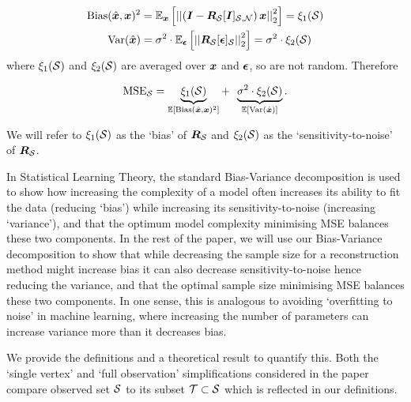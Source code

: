 \begin{align}
    \text{Bias}(\hat{\vect{x}}, \vect{x})^{2} &= \expect[\vect{x}]{\sqnormvec{\left(\matr{I} - \matr{R}_{\set{S}}\matrsub[S,N]{I}\right)\vect{x}}} 
 = \xi_{1}(\set{S}) \label{eq:def_bias_gen}\\
    \text{Var}(\hat{\vect{x}}) &= \sigma^{2} \cdot \expect[\vect{\epsilon}]{\sqnormvec{\matr{R}_{\set{S}}\vectsub[S]{\epsilon}}} = \sigma^{2} \cdot \xi_{2}(\set{S})\label{eq:def_var_gen}
\end{align}
where $\xi_{1}(\mathcal{S})$ and $\xi_{2}(\mathcal{S})$ are averaged over $\bm{x}$ and $\bm{\epsilon}$, so are not random. Therefore

\begin{equation}
    \textrm{MSE}_{\set{S}} = \underbrace{\xi_{1}(\set{S})}_{\expect{\textrm{Bias}(\hat{\vect{x}},\vect{x})^{2}}} + \enspace \underbrace{\sigma^{2} \cdot \xi_{2}(\set{S})}_{\expect{\textrm{Var}(\hat{\vect{x}})}}. \label{eq:xi_decomp}
\end{equation}

\noindent We will refer to $\xi_{1}(\mathcal{S})$ as the `bias' of $\bm{R}_{\mathcal{S}}$ and $\xi_{2}(\mathcal{S})$ as the `sensitivity-to-noise' of $\bm{R}_{\mathcal{S}}$. 

In Statistical Learning Theory, the standard Bias-Variance decomposition is used to show how increasing the complexity of a model often increases its ability to fit the data (reducing `bias') while increasing its sensitivity-to-noise (increasing `variance'), and that the optimum model complexity minimising MSE balances these two components. In the rest of the paper, we will use our Bias-Variance decomposition to show that while decreasing the sample size for a reconstruction method might increase bias it can also decrease sensitivity-to-noise hence reducing the variance, and that the optimal sample size minimising MSE balances these two components. In one sense, this is analogous to avoiding `overfitting to noise' in machine learning, where increasing the number of parameters can increase variance more than it decreases bias.

We provide the definitions and a theoretical result to quantify this. Both the `single vertex' and `full observation' simplifications considered in the paper compare observed set $\mathcal{S}$ to its subset $\mathcal{T} \subset \mathcal{S}$ which is reflected in our definitions.

